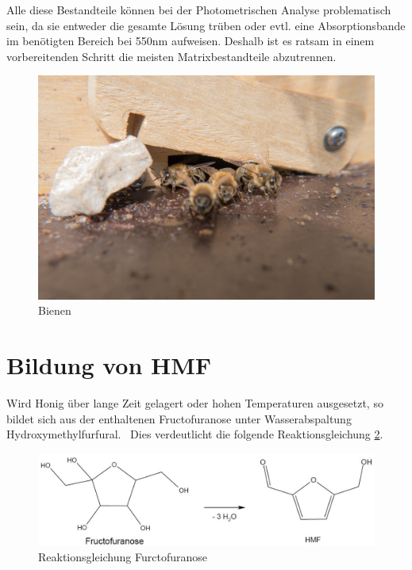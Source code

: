 Alle diese Bestandteile können bei der Photometrischen Analyse problematisch sein, da sie entweder die gesamte Lösung trüben oder evtl. eine Absorptionsbande im benötigten Bereich bei 550nm aufweisen. Deshalb ist es ratsam in einem vorbereitenden Schritt die meisten Matrixbestandteile abzutrennen.~\cite{LWG}
\begin{figure}[htbp]
	\centering
		\includegraphics[width=1.00\textwidth]{../Bilder/P1050729.jpg}
	\caption{Bienen}
	\label{fig:Bienen}
\end{figure}


\section{Bildung von HMF}

Wird Honig über lange Zeit gelagert oder hohen Temperaturen ausgesetzt, so bildet sich aus der enthaltenen Fructofuranose unter Wasserabspaltung Hydroxymethylfurfural.~\cite{HMF} Dies verdeutlicht die folgende Reaktionsgleichung \ref{fig:HMFEntstehung}. 
  
\begin{figure}[htbp]
	\centering
		\includegraphics[width=1.00\textwidth]{../Bilder/HMFEntstehung.JPG}
	\caption{Reaktionsgleichung Furctofuranose}
	\label{fig:HMFEntstehung}
\end{figure}

